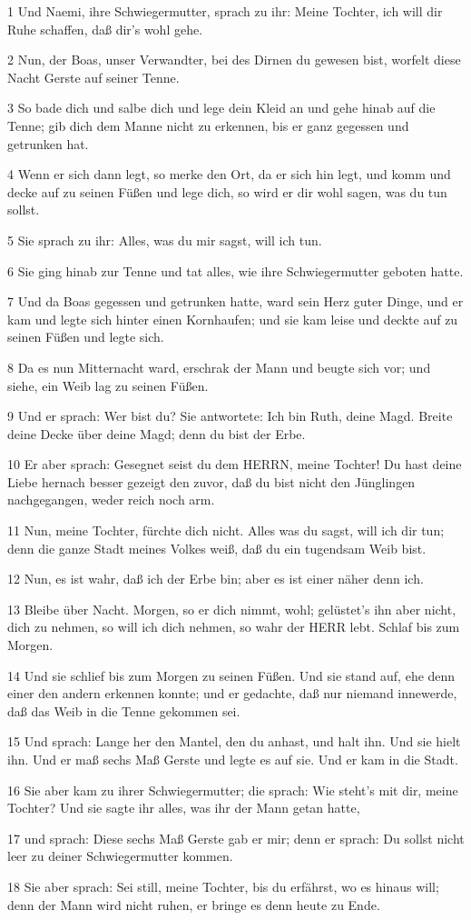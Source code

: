 \par 1 Und Naemi, ihre Schwiegermutter, sprach zu ihr: Meine Tochter, ich will dir Ruhe schaffen, daß dir's wohl gehe.
\par 2 Nun, der Boas, unser Verwandter, bei des Dirnen du gewesen bist, worfelt diese Nacht Gerste auf seiner Tenne.
\par 3 So bade dich und salbe dich und lege dein Kleid an und gehe hinab auf die Tenne; gib dich dem Manne nicht zu erkennen, bis er ganz gegessen und getrunken hat.
\par 4 Wenn er sich dann legt, so merke den Ort, da er sich hin legt, und komm und decke auf zu seinen Füßen und lege dich, so wird er dir wohl sagen, was du tun sollst.
\par 5 Sie sprach zu ihr: Alles, was du mir sagst, will ich tun.
\par 6 Sie ging hinab zur Tenne und tat alles, wie ihre Schwiegermutter geboten hatte.
\par 7 Und da Boas gegessen und getrunken hatte, ward sein Herz guter Dinge, und er kam und legte sich hinter einen Kornhaufen; und sie kam leise und deckte auf zu seinen Füßen und legte sich.
\par 8 Da es nun Mitternacht ward, erschrak der Mann und beugte sich vor; und siehe, ein Weib lag zu seinen Füßen.
\par 9 Und er sprach: Wer bist du? Sie antwortete: Ich bin Ruth, deine Magd. Breite deine Decke über deine Magd; denn du bist der Erbe.
\par 10 Er aber sprach: Gesegnet seist du dem HERRN, meine Tochter! Du hast deine Liebe hernach besser gezeigt den zuvor, daß du bist nicht den Jünglingen nachgegangen, weder reich noch arm.
\par 11 Nun, meine Tochter, fürchte dich nicht. Alles was du sagst, will ich dir tun; denn die ganze Stadt meines Volkes weiß, daß du ein tugendsam Weib bist.
\par 12 Nun, es ist wahr, daß ich der Erbe bin; aber es ist einer näher denn ich.
\par 13 Bleibe über Nacht. Morgen, so er dich nimmt, wohl; gelüstet's ihn aber nicht, dich zu nehmen, so will ich dich nehmen, so wahr der HERR lebt. Schlaf bis zum Morgen.
\par 14 Und sie schlief bis zum Morgen zu seinen Füßen. Und sie stand auf, ehe denn einer den andern erkennen konnte; und er gedachte, daß nur niemand innewerde, daß das Weib in die Tenne gekommen sei.
\par 15 Und sprach: Lange her den Mantel, den du anhast, und halt ihn. Und sie hielt ihn. Und er maß sechs Maß Gerste und legte es auf sie. Und er kam in die Stadt.
\par 16 Sie aber kam zu ihrer Schwiegermutter; die sprach: Wie steht's mit dir, meine Tochter? Und sie sagte ihr alles, was ihr der Mann getan hatte,
\par 17 und sprach: Diese sechs Maß Gerste gab er mir; denn er sprach: Du sollst nicht leer zu deiner Schwiegermutter kommen.
\par 18 Sie aber sprach: Sei still, meine Tochter, bis du erfährst, wo es hinaus will; denn der Mann wird nicht ruhen, er bringe es denn heute zu Ende.

